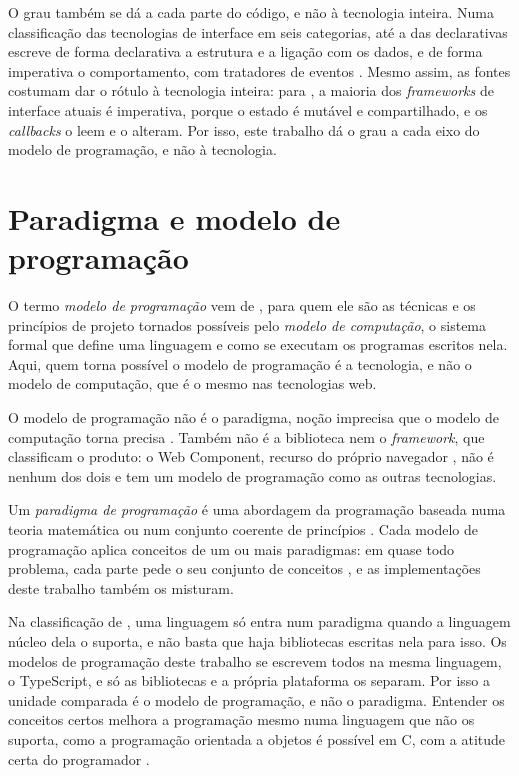 O grau também se dá a cada parte do código, e não à tecnologia inteira.
Numa classificação das tecnologias de interface em seis categorias, até a
das declarativas escreve de forma declarativa a estrutura e a ligação com
os dados, e de forma imperativa o comportamento, com tratadores de eventos
\cite[p. 765]{mijailovic2014}.
Mesmo assim, as fontes costumam dar o rótulo à tecnologia inteira: para
\textcite[p. 93]{disch2025}, a maioria dos \emph{frameworks} de interface
atuais é imperativa, porque o estado é mutável e compartilhado, e os
\emph{callbacks} o leem e o alteram.
Por isso, este trabalho dá o grau a cada eixo do modelo de programação, e
não à tecnologia.
\section{Paradigma e modelo de programação}
\label{sec:paradigma-e-modelo-de-programacao}

O termo \emph{modelo de programação} vem de
\textcite[p. xiii e 29]{vanroy2004}, para quem ele são as técnicas e os
princípios de projeto tornados possíveis pelo \emph{modelo de computação}, o
sistema formal que define uma linguagem e como se executam os programas
escritos nela.
Aqui, quem torna possível o modelo de programação é a tecnologia, e não o
modelo de computação, que é o mesmo nas tecnologias web.

O modelo de programação não é o paradigma, noção imprecisa que o modelo
de computação torna precisa \cite[p. xiii]{vanroy2004}.
Também não é a biblioteca nem o \emph{framework}, que classificam o produto: o
Web Component, recurso do próprio navegador \cite{mozilla2026}, não é
nenhum dos dois e tem um modelo de programação como as outras
tecnologias.

Um \emph{paradigma de programação} é uma abordagem da programação baseada numa
teoria matemática ou num conjunto coerente de princípios
\cite[p. 10]{vanroy2009}.
Cada modelo de programação aplica conceitos de um ou mais paradigmas:
em quase todo problema, cada parte pede o seu conjunto de conceitos
\cite[p. 10]{vanroy2009}, e as implementações deste trabalho também os
misturam.

Na classificação de \textcite[p. 14]{vanroy2009}, uma linguagem só
entra num paradigma quando a linguagem núcleo dela o suporta, e não basta
que haja bibliotecas escritas nela para isso.
Os modelos de programação deste trabalho se escrevem todos na mesma
linguagem, o TypeScript, e só as bibliotecas e a própria plataforma os
separam.
Por isso a unidade comparada é o modelo de programação, e não o
paradigma.
Entender os conceitos certos melhora a programação mesmo numa linguagem
que não os suporta, como a programação orientada a objetos é possível em
C, com a atitude certa do programador \cite[p. 10]{vanroy2009}.

